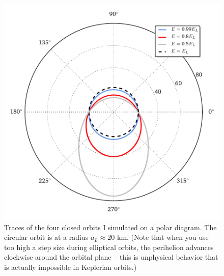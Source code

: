 \documentclass[11pt]{article}
\begin{document}
\begin{figure}[!h]
\centering
\includegraphics[scale=1]{stable_orbit/orbit_diagram.pdf}
\caption{\label{fig:trace} Traces of the four closed orbits I simulated on a polar diagram. The circular orbit is at a radius $a_L \approx 20$ km. (Note that when you use too high a step size during elliptical orbits, the perihelion advances clockwise around the orbital plane -- this is unphysical behavior that is actually impossible in Keplerian orbits.)}
\end{figure}
\end{document}
